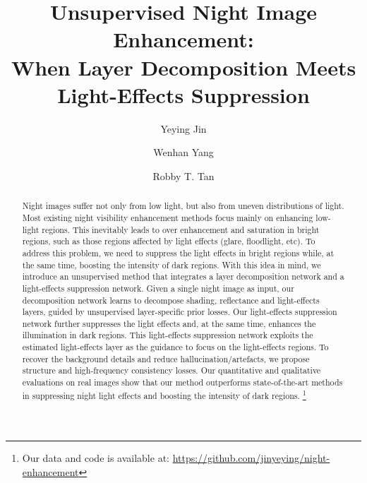 \documentclass[runningheads]{llncs}
\begin{document}
\pagestyle{headings}
\mainmatter
\def\ECCVSubNumber{982}  

\title{Unsupervised Night Image Enhancement: \\
	When Layer Decomposition Meets \\ Light-Effects Suppression} 

\begin{comment}
\titlerunning{ECCV-22 submission ID \ECCVSubNumber} 
\authorrunning{ECCV-22 submission ID \ECCVSubNumber} 
\author{Anonymous ECCV submission}
\institute{Paper ID \ECCVSubNumber}
\end{comment}


\author{Yeying Jin \and
Wenhan Yang \and
Robby T. Tan}
\maketitle

\begin{abstract}
	Night images suffer not only from low light, but also from uneven distributions of light. 
Most existing night visibility enhancement methods focus mainly on enhancing low-light regions. This inevitably leads to over enhancement and saturation in bright regions, such as those regions affected by light effects (glare, floodlight, etc).
To address this problem, we need to suppress the light effects in bright regions while, at the same time, boosting the intensity of dark regions.
With this idea in mind, we introduce an unsupervised method that integrates a layer decomposition network and a light-effects suppression network.
Given a single night image as input, our decomposition network learns to decompose shading, reflectance and light-effects layers, guided by unsupervised layer-specific prior losses.
Our light-effects suppression network further suppresses the light effects and, at the same time, enhances the illumination in dark regions.
This light-effects suppression network exploits the estimated light-effects layer as the guidance to focus on the light-effects regions.
To recover the background details and reduce hallucination/artefacts, we propose structure and high-frequency consistency losses.
Our quantitative and qualitative evaluations on real images show that our method outperforms state-of-the-art methods in suppressing night light effects and boosting the intensity of dark regions.
\footnote{Our data and code is available at: \url{https://github.com/jinyeying/night-enhancement}}
\end{abstract}
\end{document}
